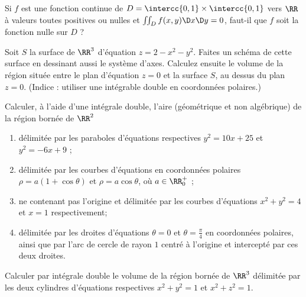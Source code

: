 \documentclass[12pt,french,oneside,a4paper]{memoir} %
\begin{document}
\begin{exo}
Si $f$ est une fonction continue de $D = \intercc{0,1}\times \intercc{0,1}$ vers $\RR$ à valeurs toutes positives ou nulles et $\iint_{D} f(x,y)  \D x \D y = 0$, faut-il que $f$ soit la fonction nulle sur $D$ ?
\end{exo}
\begin{exo}
Soit $S$ la surface de $\RR^3$ d'équation $z = 2 - x^{2} - y^{2}$. Faites un schéma de cette surface en dessinant aussi le système d'axes. Calculez ensuite le volume de la région située entre le plan d'équation $z = 0$ et la surface $S$, au dessus du plan $z = 0$. (Indice : utiliser une intégrable double en coordonnées polaires.)
\end{exo}
\begin{exo}
Calculer, à l'aide d'une intégrale double, l'aire (géométrique et non algébrique) de la région bornée de $\RR^2$
\begin{enumerate}
\item délimitée par les paraboles d'équations respectives $y^{2} = 10x + 25$ et $y^{2} = -6x + 9$ ;
\item délimitée par les courbes d'équations en coordonnées polaires $\rho = a (1+\cos \theta)$ et $\rho  = a \cos\theta$, où $a \in \RR^+_0$ ;
\item ne contenant pas l'origine et délimitée par les courbes d'équations $x^{2}+ y^{2} = 4$ et $x = 1$ respectivement;
\item délimitée par les droites d'équations $\theta = 0$ et $\theta = \frac{\pi}{4}$ en coordonnées polaires, ainsi que par l'arc de cercle de rayon $1$ centré à l'origine et intercepté par ces deux droites.
\end{enumerate}
\end{exo}

\begin{exo}
Calculer par intégrale double le volume de la région bornée de $\RR^3$ délimitée par les deux cylindres d'équations respectives $x^{2}+y^{2} = 1$ et $x^{2} + z^{2} = 1$.
\end{exo}
\end{document}
